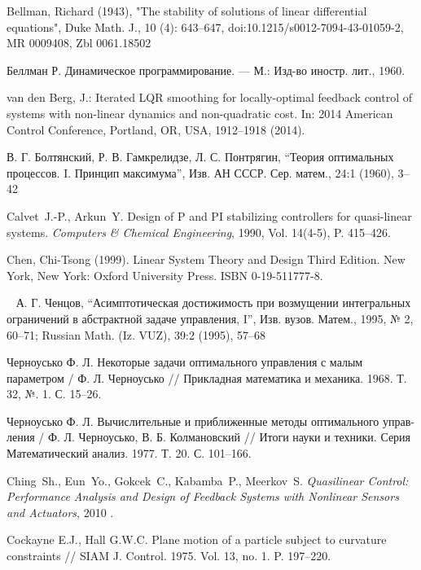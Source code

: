 \documentclass[../main.tex]{subfiles}
\begin{document}
\begin{thebibliography}{99}
Bellman, Richard (1943), "The stability of solutions of linear differential equations", Duke Math. J., 10 (4): 643–647, doi:10.1215/s0012-7094-43-01059-2, MR 0009408, Zbl 0061.18502


Беллман Р. Динамическое программирование. — М.: Изд-во иностр. лит., 1960.

van den Berg, J.: Iterated LQR smoothing for locally-optimal feedback control of systems with non-linear dynamics and non-quadratic cost. In: 2014 American Control Conference, Portland, OR, USA, 1912--1918 (2014). 

В. Г. Болтянский, Р. В. Гамкрелидзе, Л. С. Понтрягин, “Теория оптимальных процессов. I. Принцип максимума”, Изв. АН СССР. Сер. матем., 24:1 (1960),  3–42

Calvet~J.-P., Arkun~Y. Design of P and PI stabilizing controllers for quasi-linear systems. \emph{Computers \& Chemical Engineering}, 1990, Vol. 14(4-5), P. 415–426. 

Chen, Chi-Tsong (1999). Linear System Theory and Design Third Edition. New York, New York: Oxford University Press. ISBN 0-19-511777-8.

А. Г. Ченцов, “Асимптотическая достижимость при возмущении интегральных ограничений в абстрактной задаче управления, I”, Изв. вузов. Матем., 1995, № 2, 60–71; Russian Math. (Iz. VUZ), 39:2 (1995), 57–68

Черноусько Ф. Л. Некоторые задачи оптимального управления с малым параметром / Ф. Л. Черноусько // Прикладная математика и механика.  1968.  Т. 32, №. 1.  С. 15–26.

Черноусько Ф. Л. Вычислительные и приближенные методы оптимального управ-ления / Ф. Л. Черноусько, В. Б. Колмановский // Итоги науки и техники. Серия Математический анализ. 1977.  Т. 20.  С. 101–166.

Ching~Sh., Eun~Yo., Gokcek~C., Kabamba~P., Meerkov~S. \emph{Quasilinear Control: Performance Analysis and Design of Feedback Systems with Nonlinear Sensors and Actuators}, 2010 . 

Cockayne E.J., Hall G.W.C. Plane motion of a particle subject to curvature constraints // SIAM J. Control. 1975. Vol. 13, no. 1. P. 197--220.  


\end{thebibliography}
\end{document}

